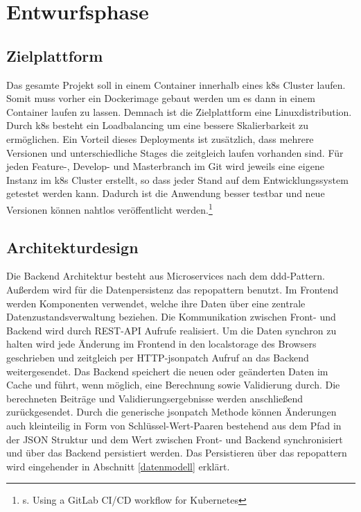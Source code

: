 \section{Entwurfsphase}
\label{entwurfsphase}
\subsection{Zielplattform}
\label{zielplattform}
Das gesamte Projekt soll in einem \gls{Container} innerhalb eines \gls{k8s} Cluster laufen. Somit muss vorher ein Dockerimage gebaut werden um es dann in einem Container laufen zu lassen. Demnach ist die Zielplattform eine Linuxdistribution. Durch \gls{k8s} besteht ein Loadbalancing um eine bessere Skalierbarkeit zu ermöglichen. Ein Vorteil dieses Deployments ist zusätzlich, dass mehrere Versionen und unterschiedliche Stages die zeitgleich laufen vorhanden sind. Für jeden Feature-, Develop- und Masterbranch im Git wird jeweils eine eigene Instanz im \gls{k8s} Cluster erstellt, so dass jeder Stand auf dem Entwicklungssystem getestet werden kann. Dadurch ist die Anwendung besser testbar und neue Versionen können nahtlos veröffentlicht werden.\footnote{s.\cite{GitlabKubernetes2021} Using a GitLab CI/CD workflow for Kubernetes}
\subsection{Architekturdesign}
\label{architekturdesign}
Die Backend Architektur besteht aus Microservices nach dem \gls{ddd}-Pattern. Außerdem wird für die Datenpersistenz das \gls{repopattern} benutzt. Im Frontend werden Komponenten verwendet, welche ihre Daten über eine zentrale Datenzustandsverwaltung beziehen. Die Kommunikation zwischen Front- und Backend wird durch REST-API Aufrufe realisiert. Um die Daten synchron zu halten wird jede Änderung im Frontend in den \gls{localstorage} des Browsers geschrieben und zeitgleich per \gls{HTTP}-\gls{jsonpatch} Aufruf an das Backend weitergesendet. Das Backend speichert die neuen oder geänderten Daten im Cache und führt, wenn möglich, eine Berechnung sowie Validierung durch. Die berechneten Beiträge und Validierungsergebnisse werden anschließend zurückgesendet. Durch die generische \gls{jsonpatch} Methode können Änderungen auch kleinteilig in Form von Schlüssel-Wert-Paaren bestehend aus dem Pfad in der JSON Struktur und dem Wert zwischen Front- und Backend synchronisiert und über das Backend persistiert werden. Das Persistieren über das \gls{repopattern} wird eingehender in Abschnitt \ref{datenmodell}  erklärt.

